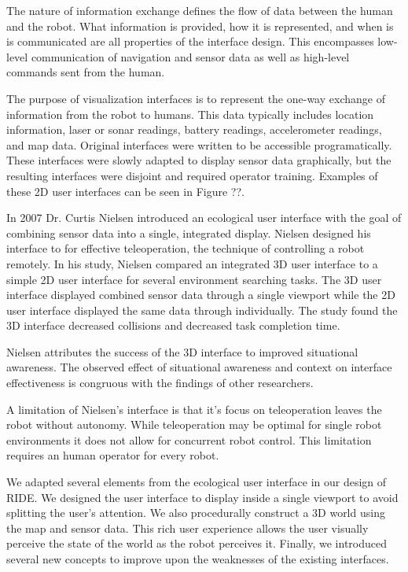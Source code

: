 The nature of information exchange defines the flow of data between the human and the robot. What information is provided, how it is represented, and when is is communicated are all properties of the interface design. This encompasses low-level communication of navigation and sensor data as well as high-level commands sent from the human. 

The purpose of visualization interfaces is to represent the one-way exchange of information from the robot to humans. This data typically includes location information, laser or sonar readings, battery readings, accelerometer readings, and map data. Original interfaces were written to be accessible programatically. These interfaces were slowly adapted to display sensor data graphically, but the resulting interfaces were disjoint and required operator training. Examples of these 2D user interfaces can be seen in Figure ??.

In 2007 Dr. Curtis Nielsen introduced an ecological user interface with the goal of combining sensor data into a single, integrated display. Nielsen designed his interface to for effective teleoperation, the technique of controlling a robot remotely. In his study, Nielsen compared an integrated 3D user interface to a simple 2D user interface for several environment searching tasks. The 3D user interface displayed combined sensor data through a single viewport while the 2D user interface displayed the same data through individually. The study found the 3D interface decreased collisions and decreased task completion time.

Nielsen attributes the success of the 3D interface to improved situational awareness. The observed effect of situational awareness and context on interface effectiveness is congruous with the findings of other researchers.

A limitation of Nielsen's interface is that it's focus on teleoperation leaves the robot without autonomy. While teleoperation may be optimal for single robot environments it does not allow for concurrent robot control. This limitation requires an human operator for every robot.

We adapted several elements from the ecological user interface in our design of RIDE. We designed the user interface to display inside a single viewport to avoid splitting the user's attention. We also procedurally construct a 3D world using the map and sensor data. This rich user experience allows the user visually perceive the state of the world as the robot perceives it. Finally, we introduced several new concepts to improve upon the weaknesses of the existing interfaces. 

